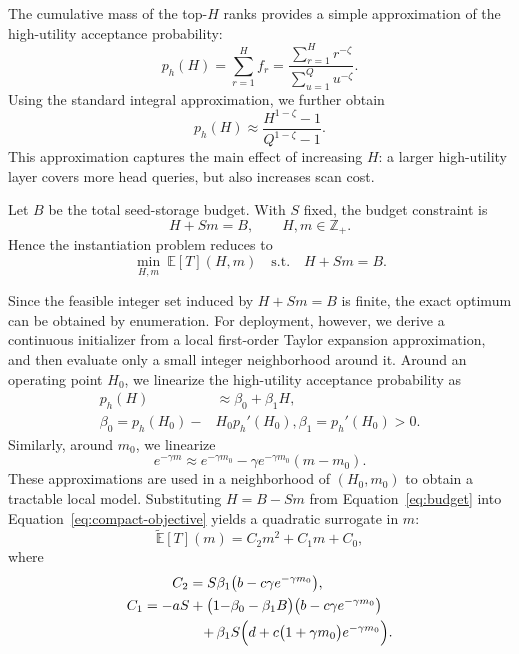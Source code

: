 The cumulative mass of the top-$H$ ranks provides a simple approximation of the high-utility acceptance probability:
\begin{equation}
p_h(H)=\sum_{r=1}^{H}f_r
=
\frac{\sum_{r=1}^{H}r^{-\zeta}}{\sum_{u=1}^{Q}u^{-\zeta}}.
\label{eq:ph-exact}
\end{equation}
Using the standard integral approximation, we further obtain
\begin{equation}
p_h(H)\approx\frac{H^{1-\zeta}-1}{Q^{1-\zeta}-1}.
\label{eq:ph-approx}
\end{equation}
This approximation captures the main effect of increasing $H$: a larger high-utility layer covers more head queries, but also increases scan cost.




Let $B$ be the total seed-storage budget.
With $S$ fixed, the budget constraint is
\begin{equation}
H+Sm=B,
\qquad
H,m \in\mathbb{Z}_{+}.
\label{eq:budget}
\end{equation}
Hence the instantiation problem reduces to
\begin{equation}
\min_{H,m}\ \mathbb{E}[T](H,m)
\quad
\text{s.t.}\quad
H+Sm=B.
\label{eq:opt-problem}
\end{equation}

Since the feasible integer set induced by $H+Sm=B$ is finite, the exact optimum can be obtained by enumeration.
For deployment, however, we derive a continuous initializer from a local first-order Taylor expansion approximation, and then evaluate only a small integer neighborhood around it.
Around an operating point $H_0$, we linearize the high-utility acceptance probability as
\begin{equation}
\begin{aligned}
p_h(H) &\approx \beta_0+\beta_1 H,\\
\beta_0 = p_h(H_0)-&H_0p_h'(H_0), \beta_1 = p_h'(H_0)>0 .
\end{aligned}
\end{equation}
Similarly, around $m_0$, we linearize
\begin{equation}
e^{-\gamma m}\approx e^{-\gamma m_0}-\gamma e^{-\gamma m_0}(m-m_0).
\end{equation}
These approximations are used in a neighborhood of $(H_0,m_0)$ to obtain a tractable local model.
Substituting $H=B-Sm$ from Equation~\eqref{eq:budget} into Equation~\eqref{eq:compact-objective} yields a quadratic surrogate in $m$:
\begin{equation}
\widetilde{\mathbb{E}}[T](m)=C_2m^2+C_1m+C_0,
\label{eq:quadratic-surrogate}
\end{equation}
where
\begin{equation}
\begin{aligned}
C_2=S\beta_1&\bigl(b-c\gamma e^{-\gamma m_0}\bigr),\\
C_1=-aS+\bigl(1-&\beta_0-\beta_1B\bigr)\bigl(b-c\gamma e^{-\gamma m_0}\bigr)\\
+\,\beta_1&S\Bigl(d+c\bigl(1+\gamma m_0\bigr)e^{-\gamma m_0}\Bigr).
\end{aligned}
\end{equation}

